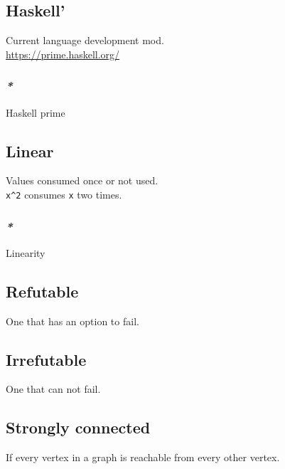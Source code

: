 \documentclass[11pt]{article}
\begin{document}
\subsection{\label{orga341d6f}Haskell'}
\label{sec:org8101be3}
Current language development mod.\\

\url{https://prime.haskell.org/}\\

\subsubsection{\emph{*}}
\label{sec:orgc9a35b6}

\label{org6f60b0b}Haskell prime\\

\subsection{\label{orgb55e183}Linear}
\label{sec:org0b887ee}
Values consumed once or not used.\\

\texttt{x\textasciicircum{}2} consumes \texttt{x} two times.\\

\subsubsection{\emph{*}}
\label{sec:org94622a9}

\label{org4f1b505}Linearity\\

\subsection{\label{org1ab1174}Refutable}
\label{sec:orge73b52b}
One that has an option to fail.\\

\subsection{\label{org5da5409}Irrefutable}
\label{sec:orgd0e12f6}
One that can not fail.\\

\subsection{\label{orgc84d9f9}Strongly connected}
\label{sec:orgcb7a014}
If every vertex in a graph is reachable from every other vertex.\\
\end{document}
